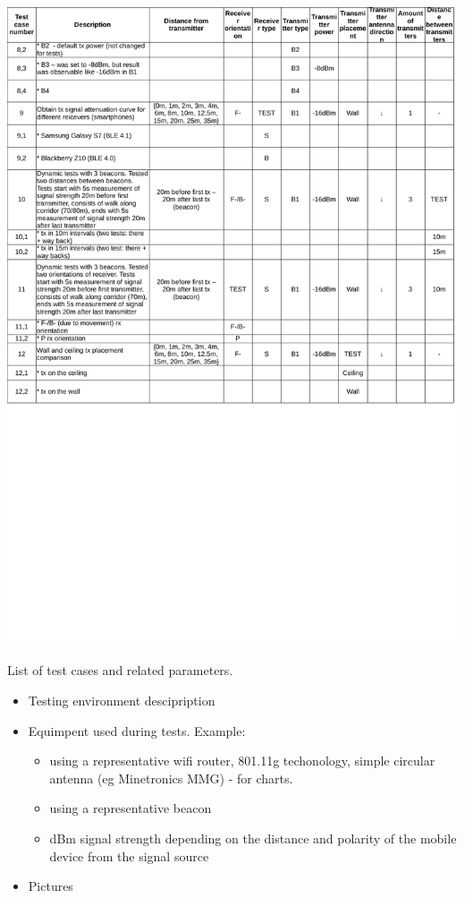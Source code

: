 \documentclass[../main.tex]{subfiles}
\begin{document}
\begin{table}[ht]
\includegraphics[width=\textwidth, trim={0 11cm 0 0},clip]{tables/test_parameters_p2.pdf}
\centering
\caption{List of test cases and related parameters.}
\label{tab:test_parameters}
\end{table}


\begin{itemize}
	\item Testing environment descipription
	\item Equimpent used during tests. Example:
	\begin{itemize}
		\item using a representative wifi router, 801.11g techonology, simple circular antenna (eg Minetronics MMG) - for charts.
		\item using a representative beacon
		\item dBm signal strength depending on the distance and polarity of the mobile device from the signal source
	\end{itemize}
	\item Pictures
\end{itemize}
\end{document}
